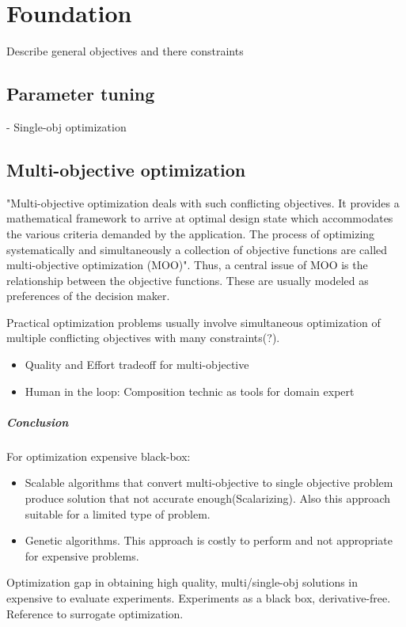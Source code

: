 \chapter{Foundation}
    Describe general objectives and there constraints

    \section{Parameter tuning}
    - Single-obj optimization
    
    \section{Multi-objective optimization}
    "Multi-objective optimization deals with such conflicting objectives. It provides a
    mathematical framework to arrive at optimal design state which accommodates the various criteria demanded by
    the application. The process of optimizing systematically and simultaneously a collection of objective functions
    are called multi-objective optimization (MOO)\cite{odugod2013}".
    Thus, a central issue of MOO is the relationship between the objective functions. These are usually modeled as preferences of the decision maker.

    Practical optimization problems usually involve simultaneous optimization of multiple conflicting objectives with many constraints(?).

    \begin{itemize}
        \item Quality and Effort tradeoff for multi-objective
        \item Human in the loop: Composition technic as tools for domain expert
    \end{itemize}

    \paragraph{Conclusion}
    For optimization expensive black-box:
    \begin{itemize}
        \item Scalable algorithms that convert multi-objective to single objective problem produce solution that not accurate enough(Scalarizing). Also this approach suitable for a limited type of problem.
        \item Genetic algorithms. This approach is costly to perform and not appropriate for expensive problems.
    \end{itemize}
    Optimization gap in obtaining high quality, multi/single-obj solutions in expensive to evaluate experiments.
    Experiments as a black box, derivative-free. Reference to surrogate optimization.

